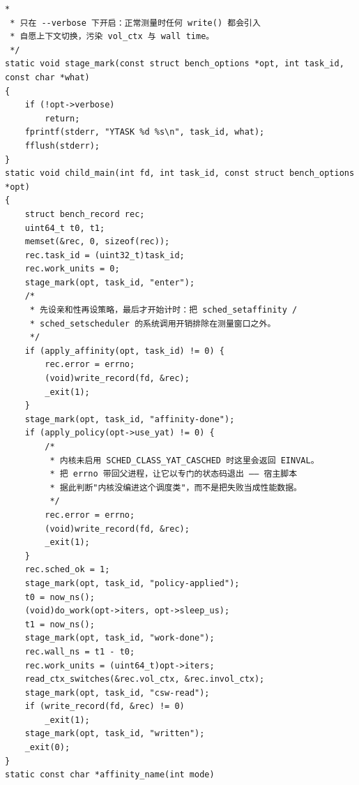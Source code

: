 \documentclass[10pt,a4paper]{article}
\newenvironment{yatpage}{\vspace*{0pt}}{\par}
\begin{document}
\begin{yatpage}
\begin{Verbatim}[fontsize=\fontsize{8.2}{9.8}\selectfont]
 *
 * 只在 --verbose 下开启：正常测量时任何 write() 都会引入
 * 自愿上下文切换，污染 vol_ctx 与 wall time。
 */
static void stage_mark(const struct bench_options *opt, int task_id, const char *what)
{
	if (!opt->verbose)
		return;
	fprintf(stderr, "YTASK %d %s\n", task_id, what);
	fflush(stderr);
}
static void child_main(int fd, int task_id, const struct bench_options *opt)
{
	struct bench_record rec;
	uint64_t t0, t1;
	memset(&rec, 0, sizeof(rec));
	rec.task_id = (uint32_t)task_id;
	rec.work_units = 0;
	stage_mark(opt, task_id, "enter");
	/*
	 * 先设亲和性再设策略，最后才开始计时：把 sched_setaffinity /
	 * sched_setscheduler 的系统调用开销排除在测量窗口之外。
	 */
	if (apply_affinity(opt, task_id) != 0) {
		rec.error = errno;
		(void)write_record(fd, &rec);
		_exit(1);
	}
	stage_mark(opt, task_id, "affinity-done");
	if (apply_policy(opt->use_yat) != 0) {
		/*
		 * 内核未启用 SCHED_CLASS_YAT_CASCHED 时这里会返回 EINVAL。
		 * 把 errno 带回父进程，让它以专门的状态码退出 —— 宿主脚本
		 * 据此判断"内核没编进这个调度类"，而不是把失败当成性能数据。
		 */
		rec.error = errno;
		(void)write_record(fd, &rec);
		_exit(1);
	}
	rec.sched_ok = 1;
	stage_mark(opt, task_id, "policy-applied");
	t0 = now_ns();
	(void)do_work(opt->iters, opt->sleep_us);
	t1 = now_ns();
	stage_mark(opt, task_id, "work-done");
	rec.wall_ns = t1 - t0;
	rec.work_units = (uint64_t)opt->iters;
	read_ctx_switches(&rec.vol_ctx, &rec.invol_ctx);
	stage_mark(opt, task_id, "csw-read");
	if (write_record(fd, &rec) != 0)
		_exit(1);
	stage_mark(opt, task_id, "written");
	_exit(0);
}
static const char *affinity_name(int mode)
\end{Verbatim}
\end{yatpage}
\newpage
\end{document}
